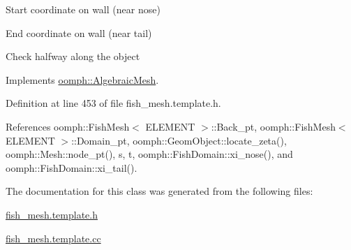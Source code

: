 Start coordinate on wall (near nose)

End coordinate on wall (near tail)

Check halfway along the object 

Implements \hyperlink{classoomph_1_1AlgebraicMesh_a6c6a35ae2be6e2766f5b80d85693c1ce}{oomph\+::\+Algebraic\+Mesh}.



Definition at line 453 of file fish\+\_\+mesh.\+template.\+h.



References oomph\+::\+Fish\+Mesh$<$ E\+L\+E\+M\+E\+N\+T $>$\+::\+Back\+\_\+pt, oomph\+::\+Fish\+Mesh$<$ E\+L\+E\+M\+E\+N\+T $>$\+::\+Domain\+\_\+pt, oomph\+::\+Geom\+Object\+::locate\+\_\+zeta(), oomph\+::\+Mesh\+::node\+\_\+pt(), s, t, oomph\+::\+Fish\+Domain\+::xi\+\_\+nose(), and oomph\+::\+Fish\+Domain\+::xi\+\_\+tail().



The documentation for this class was generated from the following files\+:\begin{DoxyCompactItemize}
\item 
\hyperlink{fish__mesh_8template_8h}{fish\+\_\+mesh.\+template.\+h}\item 
\hyperlink{fish__mesh_8template_8cc}{fish\+\_\+mesh.\+template.\+cc}\end{DoxyCompactItemize}
